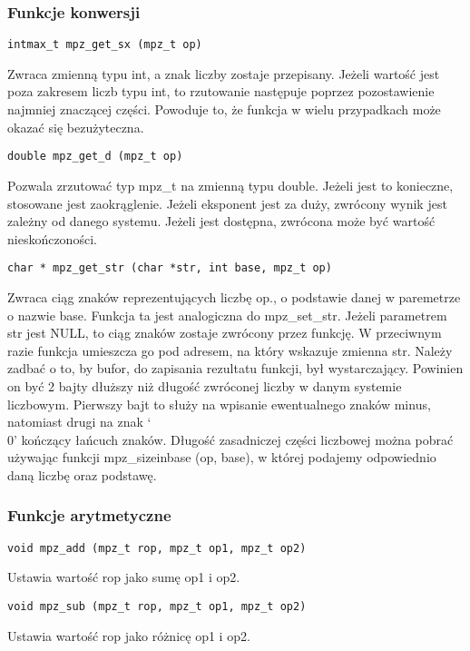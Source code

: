 \documentclass[twoside,a4paper]{book}
\begin{document}
\subsubsection{Funkcje konwersji}

\begin{lstlisting}
intmax_t mpz_get_sx (mpz_t op)
\end{lstlisting}
Zwraca zmienną typu int, a znak liczby zostaje przepisany. Jeżeli wartość jest poza zakresem liczb typu int, to rzutowanie następuje poprzez pozostawienie najmniej znaczącej części. Powoduje to, że funkcja w wielu przypadkach może okazać się bezużyteczna.

\begin{lstlisting}
double mpz_get_d (mpz_t op)
\end{lstlisting}
Pozwala zrzutować typ mpz\_t na zmienną typu double. Jeżeli jest to konieczne, stosowane jest zaokrąglenie. Jeżeli eksponent jest za duży, zwrócony wynik jest zależny od danego systemu. Jeżeli jest dostępna, zwrócona może być wartość nieskończoności.

\begin{lstlisting}
char * mpz_get_str (char *str, int base, mpz_t op)
\end{lstlisting}
Zwraca ciąg znaków reprezentujących liczbę op., o podstawie danej w paremetrze o nazwie base. Funkcja ta jest analogiczna do mpz\_set\_str. Jeżeli parametrem str jest NULL, to ciąg znaków zostaje zwrócony przez funkcję. W przeciwnym razie funkcja umieszcza go pod adresem, na który wskazuje zmienna str. Należy zadbać o to, by bufor, do zapisania rezultatu funkcji, był wystarczający. Powinien on być 2 bajty dłuższy niż długość zwróconej liczby w danym systemie liczbowym. Pierwszy bajt to służy na wpisanie ewentualnego znaków minus, natomiast drugi na znak ‘\\0’ kończący łańcuch znaków. Długość zasadniczej części liczbowej można pobrać używając funkcji mpz\_sizeinbase (op, base), w której podajemy odpowiednio daną liczbę oraz podstawę.

\subsubsection{Funkcje arytmetyczne}

\begin{lstlisting}
void mpz_add (mpz_t rop, mpz_t op1, mpz_t op2)
\end{lstlisting}
Ustawia wartość rop jako sumę op1 i op2.

\begin{lstlisting}
void mpz_sub (mpz_t rop, mpz_t op1, mpz_t op2)
\end{lstlisting}
Ustawia wartość rop jako różnicę op1 i op2.
\end{document}
